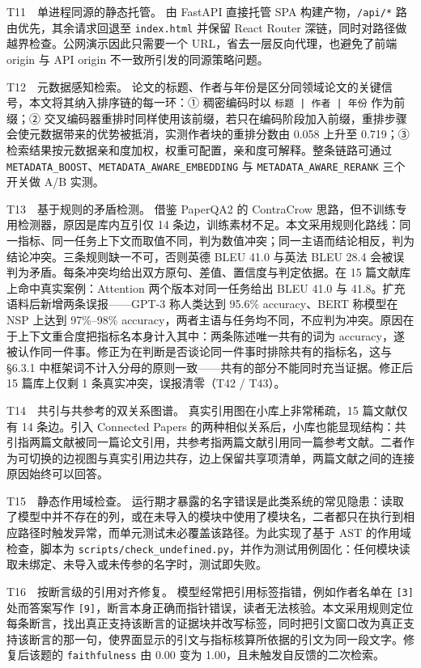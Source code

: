 \documentclass[UTF8,fontset=windows,zihao=5,a4paper]{ctexart}
\begin{document}
T11　单进程同源的静态托管。 由 FastAPI 直接托管 SPA 构建产物，\texttt{/api/*} 路由优先，其余请求回退至 \texttt{index.html} 并保留 React Router 深链，同时对路径做越界检查。公网演示因此只需要一个 URL，省去一层反向代理，也避免了前端 origin 与 API origin 不一致所引发的同源策略问题。

T12　元数据感知检索。 论文的标题、作者与年份是区分同领域论文的关键信号，本文将其纳入排序链的每一环：① 稠密编码时以 \texttt{标题 | 作者 | 年份} 作为前缀；② 交叉编码器重排时同样使用该前缀，若只在编码阶段加入前缀，重排步骤会使元数据带来的优势被抵消，实测作者块的重排分数由 0.058 上升至 0.719；③ 检索结果按元数据亲和度加权，权重可配置，亲和度可解释。整条链路可通过 \texttt{METADATA\_\allowbreak{}BOOST}、\texttt{METADATA\_\allowbreak{}AWARE\_\allowbreak{}EMBEDDING} 与 \texttt{METADATA\_\allowbreak{}AWARE\_\allowbreak{}RERANK} 三个开关做 A/B 实测。

T13　基于规则的矛盾检测。 借鉴 PaperQA2 的 ContraCrow 思路，但不训练专用检测器，原因是库内互引仅 14 条边，训练素材不足。本文采用规则化路线：同一指标、同一任务上下文而取值不同，判为数值冲突；同一主语而结论相反，判为结论冲突。三条规则缺一不可，否则英德 BLEU 41.0 与英法 BLEU 28.4 会被误判为矛盾。每条冲突均给出双方原句、差值、置信度与判定依据。在 15 篇文献库上命中真实案例：Attention 两个版本对同一任务给出 BLEU 41.0 与 41.8。扩充语料后新增两条误报——GPT-3 称人类达到 95.6\% accuracy、BERT 称模型在 NSP 上达到 97\%–98\% accuracy，两者主语与任务均不同，不应判为冲突。原因在于上下文重合度把指标名本身计入其中：两条陈述唯一共有的词为 accuracy，遂被认作同一件事。修正为在判断是否谈论同一件事时排除共有的指标名，这与 §6.3.1 中框架词不计入分母的原则一致——共有的部分不能同时充当证据。修正后 15 篇库上仅剩 1 条真实冲突，误报清零（T42 / T43）。

T14　共引与共参考的双关系图谱。 真实引用图在小库上非常稀疏，15 篇文献仅有 14 条边。引入 Connected Papers 的两种相似关系后，小库也能显现结构：共引指两篇文献被同一篇论文引用，共参考指两篇文献引用同一篇参考文献。二者作为可切换的边视图与真实引用边共存，边上保留共享项清单，两篇文献之间的连接原因始终可以回答。

T15　静态作用域检查。 运行期才暴露的名字错误是此类系统的常见隐患：读取了模型中并不存在的列，或在未导入的模块中使用了模块名，二者都只在执行到相应路径时触发异常，而单元测试未必覆盖该路径。为此实现了基于 AST 的作用域检查，脚本为 \texttt{scripts/check\_\allowbreak{}undefined.py}，并作为测试用例固化：任何模块读取未绑定、未导入或未传参的名字时，测试即失败。

T16　按断言级的引用对齐修复。 模型经常把引用标签指错，例如作者名单在 \texttt{[3]} 处而答案写作 \texttt{[9]}，断言本身正确而指针错误，读者无法核验。本文采用规则定位每条断言，找出真正支持该断言的证据块并改写标签，同时把引文窗口改为真正支持该断言的那一句，使界面显示的引文与指标核算所依据的引文为同一段文字。修复后该题的 \texttt{faithfulness} 由 0.00 变为 1.00，且未触发自反馈的二次检索。
\end{document}
